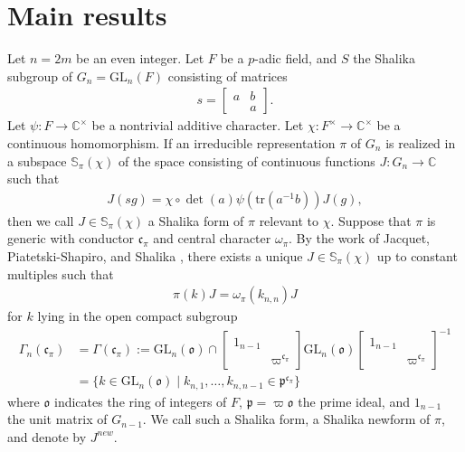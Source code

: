 \documentclass[11pt]{amsart}
\newcommand\w{\omega}
\newcommand\Vp{\varpi}%
\newcommand\vp{\varphi}%
\newcommand\oo{\mathfrak{o}}
\newcommand\p{{\mathfrak{p}}}
\newcommand\cf{{\mathfrak{c}}}
\newcommand\C{{\mathbb{C}}}%
\newcommand\Sb{{\mathbb{S}}}
\newcommand\1{\mathbf{1}}
\newcommand\tr{\mathrm{tr}}
\newcommand\GL{{\mathrm{GL}}}
\newcommand\tm{\times}
\numberwithin{equation}{section}
\begin{document}
\section{Main results}\label{sec:main}
Let $n = 2m$ be an even integer.
Let $F$ be a $p$-adic field, and $S$ the Shalika subgroup of $G_{n} = \GL_{n}(F)$ consisting of matrices 
\begin{align*}
s = \begin{bmatrix}
a &b \\
&a
\end{bmatrix}.
\end{align*} 
Let $\psi: F \to \C^\tm$ be a nontrivial additive character.
Let $\chi: F^\tm \to \C^\tm$ be a continuous homomorphism.
If an irreducible representation $\pi$ of $G_{n}$ is realized in a subspace $\Sb_\pi(\chi)$ of the space consisting of continuous functions $J: G_{n} \to \C$ such that 
\begin{align*}
J(sg) = \chi \circ \det(a) \psi(\tr(a^{-1}b))J(g), 
\end{align*} 
then we call $J \in \Sb_\pi(\chi)$ a Shalika form of $\pi$ relevant to $\chi$.
Suppose that $\pi$ is generic with conductor $\cf_\pi$ and central character $\w_\pi$.
By the work of Jacquet, Piatetski-Shapiro, and Shalika \cite{JPSS}, there exists a unique $J \in \Sb_\pi(\chi)$ up to constant multiples such that 
\begin{align*}
\pi(k)J = \w_\pi(k_{n,n})J
\end{align*} 
for $k$ lying in the open compact subgroup
\begin{align*}
\Gamma_n(\cf_\pi) & = \Gamma(\cf_\pi) := \GL_{n}(\oo) \cap \begin{bmatrix}
1_{n-1}&  \\
& \Vp^{\cf_\pi}
\end{bmatrix}\GL_{n}(\oo)\begin{bmatrix}
1_{n-1}&  \\
& \Vp^{\cf_\pi}
\end{bmatrix}^{-1} \\
&= \{k \in \GL_{n}(\oo) \mid k_{n,1}, \ldots,  k_{n,n-1} \in \p^{\cf_\pi} \} 
\end{align*}  
where $\oo$ indicates the ring of integers of $F$, $\p = \Vp \oo$ the prime ideal, and $1_{n-1}$ the unit matrix of $G_{n-1}$.
We call such a Shalika form, a Shalika newform of $\pi$, and denote by $J^{new}$.
\end{document}
